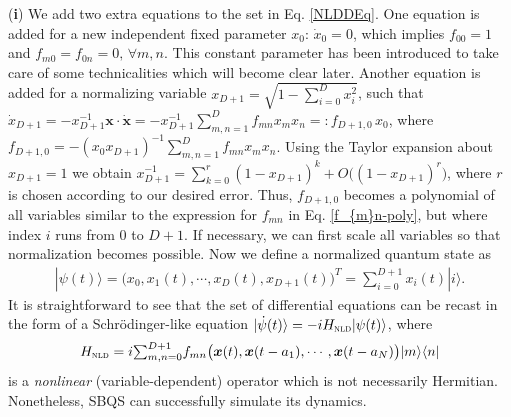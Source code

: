 \documentclass[aps,pra,twocolumn,floatfix,groupedaddress,superscriptaddress,nofootinbib,notitlepage]{revtex4-2}
\begin{document}
(\textbf{i}) We add two extra equations to the set in Eq. \eqref{NLDDEq}. One equation is added for a new independent fixed parameter $x_{0}$: $\dot{x}_{0}=0$, which implies $f_{00}=1$ and $f_{m0}=f_{0n}=0,\,\forall m,n$. This constant parameter has been introduced to take care of some technicalities which will become clear later. Another equation is added for a normalizing variable $x_{D+1}=\textstyle{\sqrt{1-\sum_{i=0}^{D} x_{i}^{2}}}$, such that $\dot{x}_{D+1} = -x_{D+1}^{-1} \boldsymbol{x} \cdot \dot{\boldsymbol{x}} = -x_{D+1}^{-1} \sum_{m,n=1}^{D} f_{mn} x_{m} x_{n}=:f_{D+1,0}\,x_{0}$, where $f_{D+1,0} =-(x_{0} x_{D+1})^{-1} \sum_{m,n=1}^{D} f_{mn} x_{m} x_{n}$. Using the Taylor expansion about $x_{D+1}=1$ we obtain $x_{D+1}^{-1}= \sum_{k=0}^{r} (1-x_{D+1})^{k} + O\big((1-x_{D+1})^{r}\big)$, where $r$ is chosen according to our desired error. Thus,  
$f_{D+1,0}$ becomes a polynomial of all variables similar to the expression for $f_{mn}$ in Eq. \eqref{f_{m}n-poly}, but where index $i$ runs from $0$ to $D+1$. If necessary, we can first scale all variables so that normalization becomes possible. Now we define a normalized quantum state as
\begin{align}
\label{var_vec}
|\psi(t)\rangle=\big(x_{0}, x_{1}(t),\cdots,x_{D}(t), x_{D+1}(t)\big)^{T} = \textstyle{\sum_{i=0}^{D+1}} x_{i}(t)|i\rangle.
\end{align}
It is straightforward to see that the set of differential equations can be recast in the form of a Schr\"{o}dinger-like equation $|\dot{\psi}(t)\rangle=-i H_{\textsc{nld}} |\psi(t)\rangle$, where  
\begin{align}
H_{\textsc{nld}}=i\textstyle{\sum}_{m,n=0}^{D+1} f_{mn}\big(\boldsymbol{x}(t),\boldsymbol{x}(t-a_{1}),\cdots, \boldsymbol{x}(t-a_{N})\big) |m\rangle\langle n|
\label{H-nonlinearEq}
\end{align}
is a \textit{nonlinear} (variable-dependent) operator which is not necessarily Hermitian. Nonetheless, SBQS can successfully simulate its dynamics.\\ 
\end{document}
